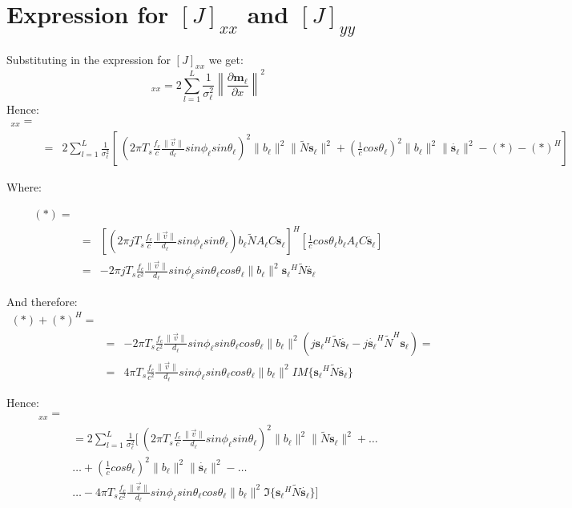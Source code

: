 \documentclass[10pt,a4paper]{report}
\begin{document}
\section{Expression for $[J]_{x x}$ and $[J]_{y y}$ }
Substituting in the expression for $[J]_{x x}$ we get:
\begin{equation}
[J]_{x x} = 2\sum_{l=1}^{L}\frac{1}{\sigma_\ell ^2}\left\|\frac{\partial \mathbf{m_\ell }}{\partial x} \right\|^2
\end{equation}
Hence:
\begin{eqnarray}
[J]_{x x} = \\
&=& 2\sum_{l=1}^{L}\frac{1}{\sigma_\ell ^2} \left[\ \left(2 \pi T_s \frac{f_c}{c}\frac{\|\vec{v}\|}{d_\ell }sin\phi_\ell  sin\theta_\ell  \right)^2 \|b_\ell \|^2\|\tilde{N}\mathbf{s_\ell }\|^2+ \left( \frac{1}{c} cos\theta_\ell  \right)^2 \|b_\ell \|^2\|\mathbf{\dot{s_\ell }}\|^2 - (*) - (*)^H \right] \nonumber
\end{eqnarray}

Where:

\begin{eqnarray}
(*) = \\
&=& \left[ \left( 2 \pi j T_s \frac{f_c}{c} \frac{\|\vec{v}\|}{d_\ell } sin\phi_\ell  sin\theta_\ell  \right) b_\ell  \tilde{N} A_\ell  C \mathbf{s_\ell } \right]^H 
\left[ \frac{1}{c} cos \theta_\ell  b_\ell  A_\ell  C \mathbf{\dot{s_\ell }} \right] \nonumber \\
&=& -2 \pi j T_s \frac{f_c}{c^2} \frac{\|\vec{v}\|}{d_\ell } sin\phi_\ell  sin \theta_\ell  cos\theta_\ell  \|b_\ell \|^2  \mathbf{s_\ell }^H \tilde{N} \mathbf{\dot{s_\ell }} \nonumber
\end{eqnarray}

And therefore:
\begin{eqnarray}
(*) + (*)^H = \\
&=& -2 \pi T_s \frac{f_c}{c^2}\frac{\|\vec{v}\|}{d_\ell }sin\phi_\ell  sin\theta_\ell  cos \theta_\ell  \|b_\ell \|^2 (j \mathbf{s_\ell }^H\tilde{N}\mathbf{\dot{s_\ell }}-j \mathbf{\dot{s_\ell }}^H\tilde{N}^H\mathbf{s_\ell }) = \nonumber \\
&=& 4 \pi T_s \frac{f_c}{c^2}\frac{\|\vec{v}\|}{d_\ell }sin\phi_\ell  sin\theta_\ell  cos \theta_\ell  \|b_\ell \|^2 IM\{\mathbf{s_\ell }^H\tilde{N}\mathbf{\dot{s_\ell }}\} \nonumber
\end{eqnarray}


Hence:
\begin{eqnarray}
[J]_{x x} = \\
&= 2\sum_{l=1}^{L}\frac{1}{\sigma_\ell ^2} [\ \left(2 \pi T_s \frac{f_c}{c}\frac{\|\vec{v}\|}{d_\ell }sin\phi_\ell  sin\theta_\ell  \right)^2 \|b_\ell \|^2\|\tilde{N}\mathbf{s_\ell }\|^2+ \dots \nonumber \\
&\dots+ \left( \frac{1}{c} cos\theta_\ell  \right)^2 \|b_\ell \|^2\|\mathbf{\dot{s_\ell }}\|^2 - \dots \nonumber \\
&\dots - 4 \pi T_s \frac{f_c}{c^2}\frac{\|\vec{v}\|}{d_\ell }sin\phi_\ell  sin\theta_\ell  cos \theta_\ell  \|b_\ell \|^2 \Im\{\mathbf{s_\ell }^H\tilde{N}\mathbf{\dot{s_\ell }}\} ] \nonumber
\end{eqnarray}
\end{document}
